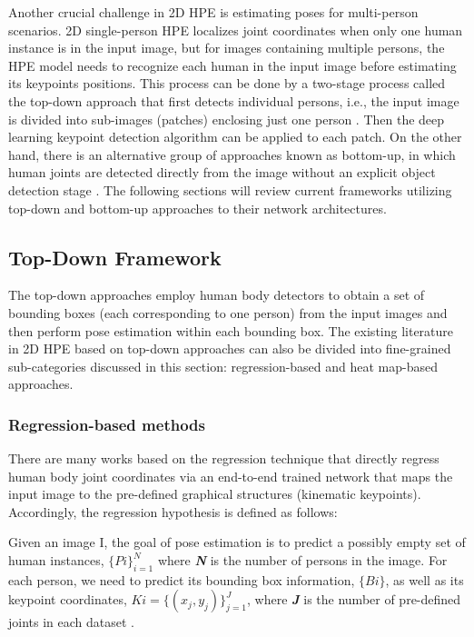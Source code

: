 Another crucial challenge in 2D HPE is estimating poses for multi-person scenarios. 2D single-person HPE localizes joint coordinates when only one human instance is in the input image, but for images containing multiple persons, the HPE model needs to recognize each human in the input image before estimating its keypoints positions. This process can be done by a two-stage process called the top-down approach that first detects individual persons, i.e., the input image is divided into sub-images (patches) enclosing just one person \cite{sun_deep_2019}. Then the deep learning keypoint detection algorithm can be applied to each patch. On the other hand, there is an alternative group of approaches known as bottom-up, in which human joints are detected directly from the image without an explicit object detection stage \cite{cheng_higherhrnet_2020}. The following sections will review current frameworks utilizing top-down and bottom-up approaches to their network architectures.

\subsection{Top-Down Framework}

The top-down approaches employ human body detectors \cite{ren_faster_2016, micilotta_real-time_2006} to obtain a set of bounding boxes (each corresponding to one person) from the input images and then perform pose estimation within each bounding box. The existing literature in 2D HPE based on top-down approaches can also be divided into fine-grained sub-categories discussed in this section: regression-based and heat map-based approaches. 

\subsubsection{Regression-based methods}

There are many works based on the regression technique \cite{carreira_human_2016, fan_combining_2015, fieraru_learning_2018, li_heterogeneous_2014, qiu_peeking_2020, sun_compositional_2017, sun_integral_2018, toshev_deeppose_2014, wang_graph-pcnn_2020,z} that directly regress human body joint coordinates via an end-to-end trained network that maps the input image to the pre-defined graphical structures (kinematic keypoints). Accordingly, the regression hypothesis is defined as follows:

Given an image I, the goal of pose estimation is to predict a possibly empty set of human instances, $\{Pi\}_{i=1}^N$ where \textbf{\textit{N}} is the number of persons in the image. For each person, we need to predict its bounding box information, $\{Bi\}$, as well as its keypoint coordinates, $Ki=\{(x_j, y_j)\}_{j=1}^J$, where \textbf{\textit{J}} is the number of pre-defined joints in each dataset \cite{li_pose_2021}.

